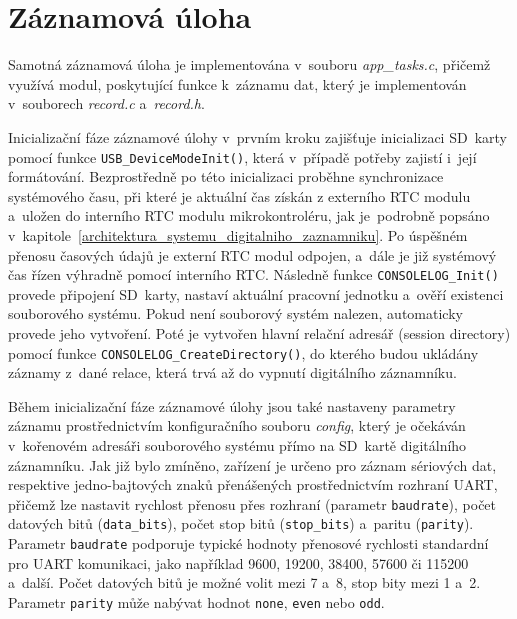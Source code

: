 \newpage

\section{Záznamová úloha}
\label{zaznamove_vlakno}
Samotná záznamová úloha je implementována v~souboru \textit{app\_tasks.c}, přičemž využívá modul, poskytující funkce k~záznamu dat, který je implementován v~souborech \textit{record.c} a~\textit{record.h}. 

Inicializační fáze záznamové úlohy v~prvním kroku zajišťuje inicializaci SD~karty pomocí funkce \texttt{USB\_DeviceModeInit()}, která v~případě potřeby zajistí i~její formátování. Bezprostředně po této inicializaci proběhne synchronizace systémového času, při které je aktuální čas získán z externího RTC modulu a~uložen do interního RTC modulu mikrokontroléru, jak je~podrobně popsáno v~kapitole~\ref{architektura_systemu_digitalniho_zaznamniku}. Po úspěšném přenosu časových údajů je externí RTC modul odpojen, a~dále je již systémový čas řízen výhradně pomocí interního RTC. Následně funkce \texttt{CONSOLELOG\_Init()} provede připojení SD~karty, nastaví aktuální pracovní jednotku a~ověří existenci souborového systému. Pokud není souborový systém nalezen, automaticky provede jeho vytvoření. Poté je vytvořen hlavní relační adresář (session directory) pomocí funkce \texttt{CONSOLELOG\_CreateDirectory()}, do kterého budou ukládány záznamy z~dané relace, která trvá až do vypnutí digitálního záznamníku.


Během inicializační fáze záznamové úlohy jsou také nastaveny parametry záznamu prostřednictvím konfiguračního souboru \textit{config}, který je očekáván v~kořenovém adresáři souborového systému přímo na SD~kartě digitálního záznamníku. Jak již bylo zmíněno, zařízení je určeno pro záznam sériových dat, respektive jedno-bajtových znaků přenášených prostřednictvím rozhraní UART, přičemž lze nastavit rychlost přenosu přes rozhraní (parametr \texttt{baudrate}), počet datových bitů (\texttt{data\_bits}), počet stop bitů (\texttt{stop\_bits}) a~paritu (\texttt{parity}). Parametr \texttt{baudrate} podporuje typické hodnoty přenosové rychlosti standardní pro UART komunikaci, jako například 9600, 19200, 38400, 57600 či 115200 a~další. Počet datových bitů je možné volit mezi 7 a~8, stop bity mezi 1 a~2. Parametr \texttt{parity} může nabývat hodnot \texttt{none}, \texttt{even} nebo \texttt{odd}.

